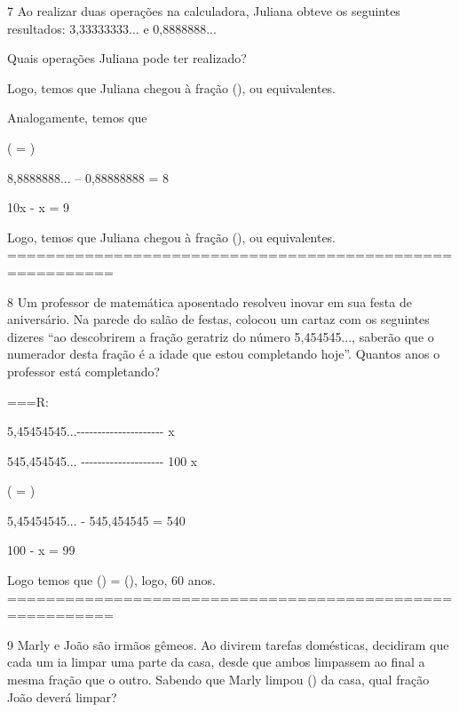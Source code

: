 

\num{7} Ao realizar duas operações na calculadora, Juliana obteve os
seguintes resultados: 3,33333333... e 0,8888888...

Quais operações Juliana pode ter realizado?



Logo, temos que Juliana chegou à fração (), ou
equivalentes.

Analogamente, temos que

( = )

8,8888888... -- 0,88888888 = 8

10x - x = 9

Logo, temos que Juliana chegou à fração (), ou
equivalentes.
=========================================================

\num{8} Um professor de matemática aposentado resolveu inovar em sua festa de
aniversário. Na parede do salão de festas, colocou um cartaz com os
seguintes dizeres ``ao descobrirem a fração geratriz do número
5,454545..., saberão que o numerador desta fração é a idade que estou
completando hoje''. Quantos anos o professor está completando?

===R:

5,45454545...-\/-\/-\/-\/-\/-\/-\/-\/-\/-\/-\/-\/-\/-\/-\/-\/-\/-\/-\/-\/-
x

545,454545... -\/-\/-\/-\/-\/-\/-\/-\/-\/-\/-\/-\/-\/-\/-\/-\/-\/-\/-\/-
100 x

( = )

5,45454545... - 545,454545 = 540

100 - x = 99

Logo temos que () = (), logo, 60 anos.
=========================================================

\num{9} Marly e João são irmãos gêmeos. Ao divirem tarefas domésticas,
decidiram que cada um ia limpar uma parte da casa, desde que ambos
limpassem ao final a mesma fração que o outro. Sabendo que Marly limpou
() da casa, qual fração João deverá limpar?


